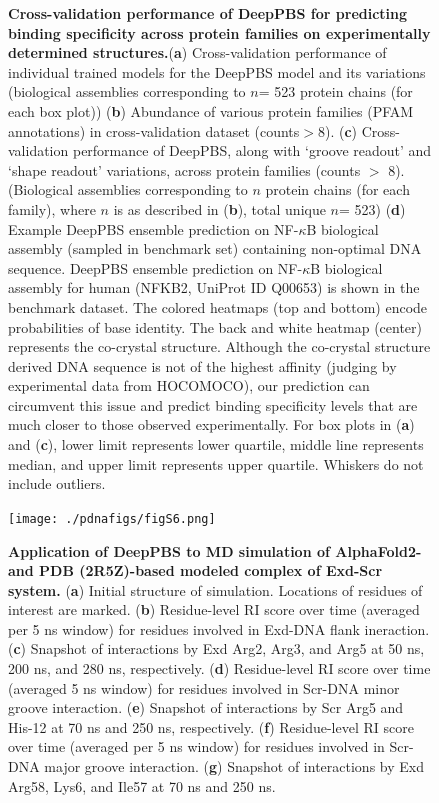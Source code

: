 \begin{center}
\begin{figure} [H]
  \caption[Cross-validation performance of DeepPBS for predicting binding specificity across protein families on experimentally determined structures.]{\textbf{Cross-validation performance of DeepPBS for predicting binding specificity across protein families on experimentally determined structures.}({\bf a}) Cross-validation performance of individual trained models for the DeepPBS model and its variations (biological assemblies corresponding to $n$= 523 protein chains (for each box plot)) ({\bf b}) Abundance of various protein families (PFAM annotations) in cross-validation dataset (counts$>$8). ({\bf c}) Cross-validation performance of DeepPBS, along with ‘groove readout’ and ‘shape readout’ variations, across protein families (counts $>$ 8). (Biological assemblies corresponding to $n$ protein chains (for each family), where $n$ is as described in ({\bf b}), total unique $n$= 523) ({\bf d}) Example DeepPBS ensemble prediction on NF-$\kappa$B biological assembly (sampled in benchmark set) containing non-optimal DNA sequence. DeepPBS ensemble prediction on NF-$\kappa$B biological assembly for human (NFKB2, UniProt ID Q00653) is shown in the benchmark dataset. The colored heatmaps (top and bottom) encode probabilities of base identity. The back and white heatmap (center) represents the co-crystal structure. Although the co-crystal structure derived DNA sequence is not of the highest affinity (judging by experimental data from HOCOMOCO), our prediction can circumvent this issue and predict binding specificity levels that are much closer to those observed experimentally. For box plots in ({\bf a}) and ({\bf c}), lower limit represents lower quartile, middle line represents median, and upper limit represents upper quartile. Whiskers do not include outliers.}
\end{figure}
\end{center}

\begin{center}
\begin{figure}[H]
  \texttt{[image: ./pdnafigs/figS6.png]}
    \caption[Application of DeepPBS to MD simulation of AlphaFold2- and PDB (2R5Z)-based modeled complex of Exd-
Scr system. ]{\textbf{Application of DeepPBS to MD simulation of AlphaFold2- and PDB (2R5Z)-based modeled complex of Exd-Scr system.} ({\bf a}) Initial structure of simulation. Locations of residues of interest are marked. ({\bf b}) Residue-level RI score over time (averaged per 5 ns window) for residues involved in Exd-DNA flank ineraction. ({\bf c}) Snapshot of interactions by Exd Arg2, Arg3, and Arg5 at 50 ns, 200 ns, and 280 ns, respectively. ({\bf d}) Residue-level RI score over time (averaged 5 ns window) for residues involved in Scr-DNA minor groove interaction. ({\bf e}) Snapshot of interactions by Scr Arg5 and His-12 at 70 ns and 250 ns, respectively. ({\bf f}) Residue-level RI score over time (averaged per 5 ns window) for residues involved in Scr-DNA major groove interaction. ({\bf g}) Snapshot of interactions by Exd Arg58, Lys6, and Ile57 at 70 ns and 250 ns.}
  \label{fig:pdnaS6}
\end{figure}
\end{center}

